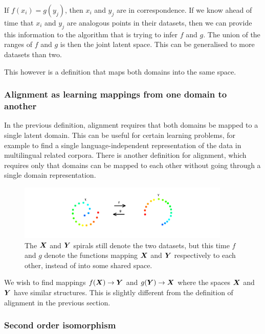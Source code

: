 If $f(x_i) = g(y_j)$, then $x_i$ and $y_j$ are in correspondence. If we know ahead of time that $x_i$ and $y_j$ are analogous points in their datasets, then we can provide this information to the algorithm that is trying to infer $f$ and $g$. The union of the ranges of $f$ and $g$ is then the joint latent space. This can be generalised to more datasets than two. 

This however is a definition that maps both domains into the same space. 

\subsubsection{Alignment as learning mappings from one domain to another}

In the previous definition, alignment requires that both domains be mapped to a single latent domain. This can be useful for certain learning problems, for example to find a single language-independent representation of the data in multilingual related corpora. There is another definition for alignment, which requires only that domains can be mapped to each other without going through a single domain representation. 

\begin{figure}[H]
    \centering
    \includegraphics[width=0.9\textwidth]{images/review/alignment2.png}
    \caption{
        The $\boldsymbol{X}$ and $\boldsymbol{Y}$ spirals still denote the two datasets, but this time $f$ and $g$ denote the functions mapping $\boldsymbol{X}$ and $\boldsymbol{Y}$ respectively to each other, instead of into some shared space.
    }
\end{figure}

We wish to find mappings $f(\boldsymbol{X}) \rightarrow \boldsymbol{Y}$ and $g(\boldsymbol{Y}) \rightarrow \boldsymbol{X}$ where the spaces $\boldsymbol{X}$ and $\boldsymbol{Y}$  have similar structures. This is slightly different from the definition of alignment in the previous section. 

\subsubsection{Second order isomorphism}

